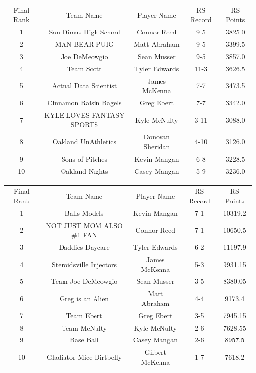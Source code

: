 \documentclass[11pt,letterpaper]{article}
\begin{document}
\vspace{-25pt}
\begin{table} [h]
\begin{center}
\begin{tabular} { c c c c c }
\\ Final Rank & Team Name & Player Name & RS Record & RS Points
\\ 1  & San Dimas High School & Connor Reed & 9-5 & 3825.0
\\ 2  & MAN BEAR PUIG  & Matt Abraham & 9-5 & 3399.5
\\ 3  & Joe DeMeowgio & Sean Musser & 9-5 & 3857.0
\\ 4  & Team Scott & Tyler Edwards & 11-3 & 3626.5
\\ 5  & Actual Data Scientist & James McKenna & 7-7 & 3473.5
\\ 6  & Cinnamon Raisin Bagels & Greg Ebert & 7-7 & 3342.0
\\ 7  & KYLE LOVES FANTASY SPORTS & Kyle McNulty & 3-11 & 3088.0
\\ 8  & Oakland UnAthletics & Donovan Sheridan & 4-10 & 3126.0
\\ 9  & Sons of Pitches & Kevin Mangan & 6-8 & 3228.5
\\ 10  & Oakland Nights & Casey Mangan & 5-9 & 3236.0
\end{tabular}
\end{center}
\end{table}


\newpage
{}
\vspace{-25pt}
\begin{table} [h]
\begin{center}
\begin{tabular} { c c c c c }
\\ Final Rank & Team Name & Player Name & RS Record & RS Points
\\ 1  & Balls Models & Kevin Mangan & 7-1 & 10319.2
\\ 2  & NOT JUST MOM ALSO \#1 FAN & Connor Reed & 7-1 & 10650.5
\\ 3  & Daddies Daycare & Tyler Edwards & 6-2 & 11197.9
\\ 4  & Steroidsville Injectors & James McKenna & 5-3 & 9931.15
\\ 5  & Team Joe DeMeowgio & Sean Musser & 3-5 & 8380.05
\\ 6  & Greg is an Alien & Matt Abraham & 4-4 & 9173.4
\\ 7  & Team Ebert & Greg Ebert & 3-5 & 7945.15
\\ 8  & Team McNulty & Kyle McNulty & 2-6 & 7628.55
\\ 9  & Base Ball & Casey Mangan & 2-6 & 8957.5
\\ 10  & Gladiator Mice Dirtbelly & Gilbert McKenna & 1-7 & 7618.2
\end{tabular}
\end{center}
\end{table}
\end{document}
